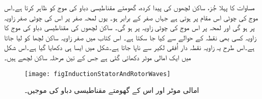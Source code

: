 مساوات   کا پہلا جُز، ساکن لچھوں کی پیدا کردہ، گھومتے مقناطیسی دباو کی موج کو ظاہر کرتا ہے۔اس موج کی چوٹی اس مقام پر ہوتی ہے جہاں  صفر کے برابر ہو۔ یوں لمحہ صفر پر اس کی چوٹی صفر زاویہ پر ہو گی اور لمحہ  پر اس موج کی چوٹی زاویہ  پر ہو گی۔ ساکن لچھوں کی مقناطیسی دباو کی موج کا زاویہ کسی بھی نقطہ کے حوالے سے کیا جا سکتا ہے۔ اس کتاب میں صفر زاویہ ساکن لچھا  کو لیا جاتا ہے۔اس طرح یہ زاویہ نقطہ دار اُفقی لکیر سے ناپا جاتا ہے۔شکل   میں ایسا ہی دکھایا گیا ہے۔اس شکل میں ایک امالی موٹر دکھائی گئی ہے جس کے تین مرحلہ ساکن لچھے ہیں۔
\begin{figure}
\centering
\texttt{[image: figInductionStatorAndRotorWaves]}
\caption{امالی موٹر اور اس کے گھومتے مقناطیسی دباو کی موجیں۔}
\label{شکل_امالی_گھومتی_موجیں}
\end{figure}

